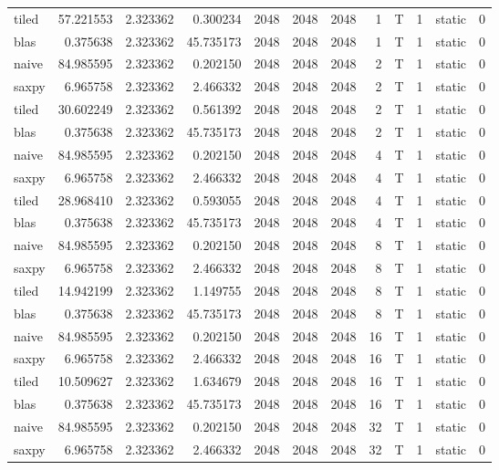 \documentclass[
  12pt,
  xcolor = usenames,dvipsnames]{article}
\begin{document}
\begin{table}[!h]
{\begin{tabular}[t]{lrrrrrrrlrlr}
tiled & 57.221553 & 2.323362 & 0.300234 & 2048 & 2048 & 2048 & 1 & T & 1 & static & 0\\
blas & 0.375638 & 2.323362 & 45.735173 & 2048 & 2048 & 2048 & 1 & T & 1 & static & 0\\
naive & 84.985595 & 2.323362 & 0.202150 & 2048 & 2048 & 2048 & 2 & T & 1 & static & 0\\
\addlinespace
saxpy & 6.965758 & 2.323362 & 2.466332 & 2048 & 2048 & 2048 & 2 & T & 1 & static & 0\\
tiled & 30.602249 & 2.323362 & 0.561392 & 2048 & 2048 & 2048 & 2 & T & 1 & static & 0\\
blas & 0.375638 & 2.323362 & 45.735173 & 2048 & 2048 & 2048 & 2 & T & 1 & static & 0\\
naive & 84.985595 & 2.323362 & 0.202150 & 2048 & 2048 & 2048 & 4 & T & 1 & static & 0\\
saxpy & 6.965758 & 2.323362 & 2.466332 & 2048 & 2048 & 2048 & 4 & T & 1 & static & 0\\
\addlinespace
tiled & 28.968410 & 2.323362 & 0.593055 & 2048 & 2048 & 2048 & 4 & T & 1 & static & 0\\
blas & 0.375638 & 2.323362 & 45.735173 & 2048 & 2048 & 2048 & 4 & T & 1 & static & 0\\
naive & 84.985595 & 2.323362 & 0.202150 & 2048 & 2048 & 2048 & 8 & T & 1 & static & 0\\
saxpy & 6.965758 & 2.323362 & 2.466332 & 2048 & 2048 & 2048 & 8 & T & 1 & static & 0\\
tiled & 14.942199 & 2.323362 & 1.149755 & 2048 & 2048 & 2048 & 8 & T & 1 & static & 0\\
\addlinespace
blas & 0.375638 & 2.323362 & 45.735173 & 2048 & 2048 & 2048 & 8 & T & 1 & static & 0\\
naive & 84.985595 & 2.323362 & 0.202150 & 2048 & 2048 & 2048 & 16 & T & 1 & static & 0\\
saxpy & 6.965758 & 2.323362 & 2.466332 & 2048 & 2048 & 2048 & 16 & T & 1 & static & 0\\
tiled & 10.509627 & 2.323362 & 1.634679 & 2048 & 2048 & 2048 & 16 & T & 1 & static & 0\\
blas & 0.375638 & 2.323362 & 45.735173 & 2048 & 2048 & 2048 & 16 & T & 1 & static & 0\\
\addlinespace
naive & 84.985595 & 2.323362 & 0.202150 & 2048 & 2048 & 2048 & 32 & T & 1 & static & 0\\
saxpy & 6.965758 & 2.323362 & 2.466332 & 2048 & 2048 & 2048 & 32 & T & 1 & static & 0\\

\end{tabular}}
\end{table}
\end{document}
